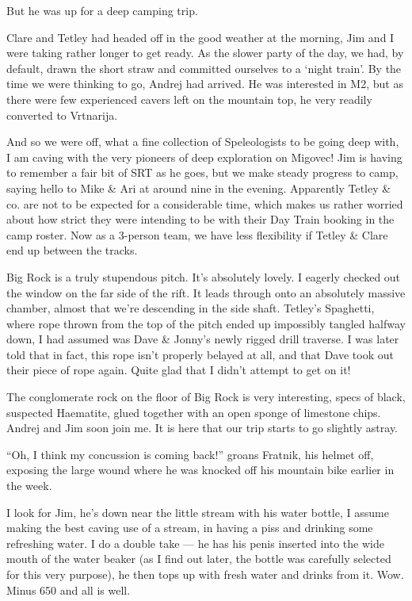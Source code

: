 But he was up for a deep camping trip.

Clare and Tetley had headed off in the good weather at the morning, Jim
and I were taking rather longer to get ready. As the slower party of the
day, we had, by default, drawn the short straw and committed ourselves
to a `night train'. By the time we were thinking to go, Andrej had
arrived. He was interested in M2, but as there were few experienced
cavers left on the mountain top, he very readily converted to Vrtnarija.

And so we were off, what a fine collection of Speleologists to be going
deep with, I am caving with the very pioneers of deep exploration on
Migovec! Jim is having to remember a fair bit of SRT as he goes, but we
make steady progress to camp, saying hello to Mike \& Ari at around nine
in the evening. Apparently Tetley \& co. are not to be expected for a
considerable time, which makes us rather worried about how strict they
were intending to be with their Day Train booking in the camp roster.
Now as a 3-person team, we have less flexibility if Tetley \& Clare end
up between the tracks.

Big Rock is a truly stupendous pitch. It's absolutely lovely. I eagerly
checked out the window on the far side of the rift. It leads through
onto an absolutely massive chamber, almost that we're descending in the
side shaft. Tetley's Spaghetti, where rope thrown from the top of the
pitch ended up impossibly tangled halfway down, I had assumed was Dave
\& Jonny's newly rigged drill traverse. I was later told that in fact,
this rope isn't properly belayed at all, and that Dave took out their
piece of rope again. Quite glad that I didn't attempt to get on it!

The conglomerate rock on the floor of Big Rock is very interesting,
specs of black, suspected Haematite, glued together with an open sponge
of limestone chips. Andrej and Jim soon join me. It is here that our
trip starts to go slightly astray.

``Oh, I think my concussion is coming back!'' groans Fratnik, his helmet
off, exposing the large wound where he was knocked off his mountain bike
earlier in the week.

I look for Jim, he's down near the little stream with his water bottle,
I assume making the best caving use of a stream, in having a piss and
drinking some refreshing water. I do a double take --- he has his penis
inserted into the wide mouth of the water beaker (as I find out later,
the bottle was carefully selected for this very purpose), he then tops
up with fresh water and drinks from it. Wow. Minus 650 and all is well.

